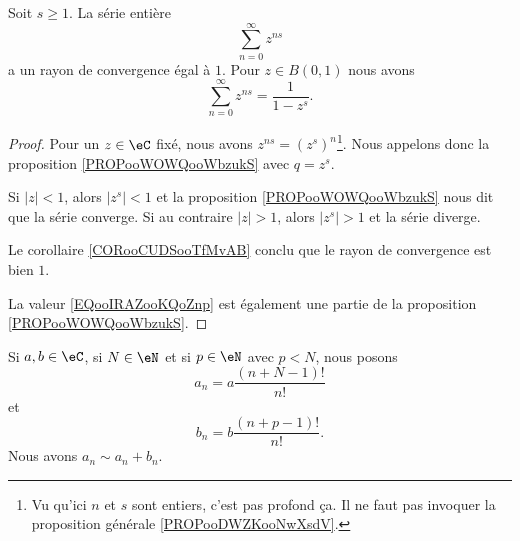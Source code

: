 \begin{lemma}       \label{LEMooRJOKooPJGVTr}
    Soit \( s\geq 1\). La série entière
    \begin{equation}
        \sum_{n=0}^{\infty}z^{ns}
    \end{equation}
    a un rayon de convergence égal à \( 1\). Pour \(z\in B(0,1)\) nous avons
    \begin{equation}        \label{EQooIRAZooKQoZnp}
        \sum_{n=0}^{\infty}z^{ns}=\frac{1}{ 1-z^s }.
    \end{equation}
\end{lemma}

\begin{proof}
    Pour un \( z\in \eC\) fixé, nous avons \( z^{ns}=(z^s)^n\)\footnote{Vu qu'ici \( n\) et \( s\) sont entiers, c'est pas profond ça. Il ne faut pas invoquer la proposition générale \ref{PROPooDWZKooNwXsdV}.}. Nous appelons donc la proposition \ref{PROPooWOWQooWbzukS} avec \( q=z^s\).

    Si \( | z |<1\), alors \( | z^s |<1\) et la proposition \ref{PROPooWOWQooWbzukS} nous dit que la série converge. Si au contraire \( | z |>1\), alors \( | z^s |>1\) et la série diverge.

    Le corollaire \ref{CORooCUDSooTfMvAB} conclu que le rayon de convergence est bien \( 1\).

    La valeur \eqref{EQooIRAZooKQoZnp} est également une partie de la proposition \ref{PROPooWOWQooWbzukS}.
\end{proof}


\begin{lemma}       \label{LEMooVMLEooCzPuKy}
    Si \( a,b\in \eC\), si \( N\in \eN\) et si \( p\in \eN\) avec \( p<N\), nous posons
    \begin{equation}
        a_n=a\frac{ (n+N-1)! }{ n! }
    \end{equation}
    et 
    \begin{equation}
        b_n=b\frac{ (n+p-1)! }{ n! }.
    \end{equation}
    Nous avons \( a_n\sim a_n+b_n\).
\end{lemma}

